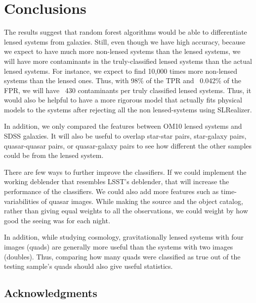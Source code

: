 \documentclass[\docopts]{\docclass}
\begin{document}

\section{Conclusions}
\label{sec:conclusions}

The results suggest that random forest algorithms would be able to
differentiate lensed systems from galaxies. Still, even though we have
high accuracy, because we expect to have much more non-lensed systems
than the lensed systems, we will have more contaminants in the
truly-classified lensed systems than the actual lensed systems. For
instance, we expect to find 10,000 times more non-lensed systems than
the lensed ones. Thus, with 98\% of the TPR and ~0.042\% of the FPR, we
will have ~430 contaminants per truly classified lensed systems. Thus,
it would also be helpful to have a more rigorous model that actually
fits physical models to the systems after rejecting all the non
lensed-systems using SLRealizer.

In addition, we only compared the features between OM10 lensed systems
and SDSS galaxies. It will also be useful to overlap star-star pairs,
star-galaxy pairs, quasar-quasar pairs, or quasar-galaxy pairs to see
how different the other samples could be from the lensed system.

There are few ways to further improve the classifiers. If we could
implement the working deblender that resembles LSST’s deblender, that
will increase the performance of the classifiers. We could also add more
features such as time-variabilities of quasar images. While making the
source and the object catalog, rather than giving equal weights to all
the observations, we could weight by how good the seeing was for each
night.

In addition, while studying cosmology, gravitationally lensed systems
with four images (quads) are generally more useful than the systems with
two images (doubles). Thus, comparing how many quads were classified as
true out of the testing sample’s quads should also give useful
statistics.


\subsection*{Acknowledgments}






\end{document}

